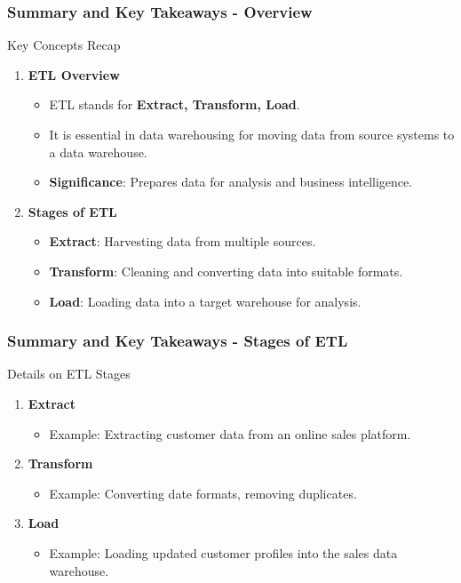 \documentclass[aspectratio=169]{beamer}
\begin{document}
\begin{frame}[fragile]
    \frametitle{Summary and Key Takeaways - Overview}
    \begin{block}{Key Concepts Recap}
        \begin{enumerate}
            \item \textbf{ETL Overview}
            \begin{itemize}
                \item ETL stands for \textbf{Extract, Transform, Load}.
                \item It is essential in data warehousing for moving data from source systems to a data warehouse.
                \item \textbf{Significance}: Prepares data for analysis and business intelligence.
            \end{itemize}

            \item \textbf{Stages of ETL}
            \begin{itemize}
                \item \textbf{Extract}: Harvesting data from multiple sources.
                \item \textbf{Transform}: Cleaning and converting data into suitable formats.
                \item \textbf{Load}: Loading data into a target warehouse for analysis.
            \end{itemize}
        \end{enumerate}
    \end{block}
\end{frame}

\begin{frame}[fragile]
    \frametitle{Summary and Key Takeaways - Stages of ETL}
    \begin{block}{Details on ETL Stages}
        \begin{enumerate}
            \item \textbf{Extract}
            \begin{itemize}
                \item Example: Extracting customer data from an online sales platform.
            \end{itemize}

            \item \textbf{Transform}
            \begin{itemize}
                \item Example: Converting date formats, removing duplicates.
            \end{itemize}

            \item \textbf{Load}
            \begin{itemize}
                \item Example: Loading updated customer profiles into the sales data warehouse.
            \end{itemize}
        \end{enumerate}
    \end{block}
\end{frame}
\end{document}
